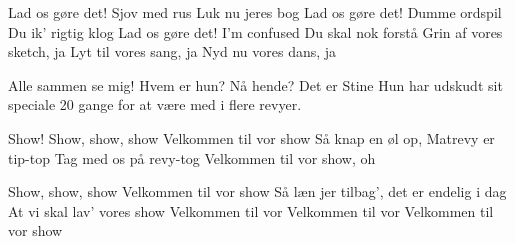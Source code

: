 \documentclass[a4paper,11pt]{article}
\begin{document}
\begin{song}
 Lad os gøre det!
  Sjov med rus
 Luk nu jeres bog
 Lad os gøre det!
  Dumme ordspil
 Du ik' rigtig klog
 Lad os gøre det!
  I'm confused
 Du skal nok forstå
Grin af vores sketch, ja
Lyt til vores sang, ja
Nyd nu vores dans, ja

 Alle sammen se mig!
  Hvem er hun?
  Nå hende? Det er Stine
Hun har udskudt sit speciale 20 gange for at være med i flere revyer.

 Show!
Show, show, show
Velkommen til vor show
Så knap en øl op, Matrevy er tip-top
Tag med os på revy-tog
Velkommen til vor show, oh

Show, show, show
Velkommen til vor show
Så læn jer tilbag', det er endelig i dag
At vi skal lav' vores show
Velkommen til vor
Velkommen til vor
Velkommen til vor show
\end{song}
\end{document}
